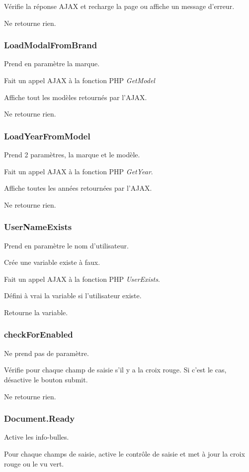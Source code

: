 \documentclass[a4paper]{article}
\begin{document}
Vérifie la réponse AJAX et recharge la page ou affiche un message d'erreur.

Ne retourne rien.

\subsubsection{LoadModalFromBrand}
Prend en paramètre la marque.

Fait un appel AJAX à la fonction PHP \emph{GetModel}

Affiche tout les modèles retournés par l'AJAX.

Ne retourne rien.

\subsubsection{LoadYearFromModel}
Prend 2 paramètres, la marque et le modèle.

Fait un appel AJAX à la fonction PHP \emph{GetYear}.

Affiche toutes les années retournées par l'AJAX.

Ne retourne rien.

\subsubsection{UserNameExists}
Prend en paramètre le nom d'utilisateur.

Crée une variable existe à faux.

Fait un appel AJAX à la fonction PHP \emph{UserExists}.

Défini à vrai la variable si l'utilisateur existe.

Retourne la variable.

\subsubsection{checkForEnabled}
Ne prend pas de paramètre.

Vérifie pour chaque champ de saisie s'il y a la croix rouge. Si c'est le cas, désactive le bouton submit.

Ne retourne rien.

\subsubsection{Document.Ready}
Active les info-bulles.

Pour chaque champs de saisie, active le contrôle de saisie et met à jour la croix rouge ou le vu vert.
\end{document}
